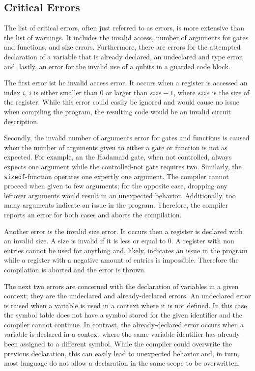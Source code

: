 \subsection{Critical Errors}
The list of critical errors, often just referred to as errors, is more extensive than the list of warnings. It includes the invalid access, number of arguments for gates and functions, and size errors. Furthermore, there are errors for the attempted declaration of a variable that is already declared, an undeclared and type error, and, lastly, an error for the invalid use of a qubits in a guarded code block.

The first error ist he invalid access error. It occurs when a register is accessed an index $i$, \ie $i$ is either smaller than $0$ or larger than $size - 1$, where $size$ is the size of the register. While this error could easily be ignored and would cause no issue when compiling the program, the resulting code would be an invalid circuit description. 

Secondly, the invalid number of arguments error for gates and functions is caused when the number of arguments given to either a gate or function is not as expected. For example, an the Hadamard gate, when not controlled, always expects one argument while the controlled-not gate requires two. Similarly, the \texttt{sizeof}-function operates one expertly one argument. The compiler cannot proceed when given to few arguments; for the opposite case, dropping any leftover arguments would result in an unexpected behavior. Additionally, too many arguments indicate an issue in the program. Therefore, the compiler reports an error for both cases and aborts the compilation.

Another error is the invalid size error. It occurs then a register is declared with an invalid size. A size is invalid if it is less or equal to $0$. A register with non entries cannot be used for anything and, likely, indicates an issue in the program while a register with a negative amount of entries is impossible. Therefore the compilation is aborted and the error is thrown.

The next two errors are concerned with the declaration of variables in a given context; they are the undeclared and already-declared errors. An undeclared error is raised when a variable is used in a context where it is not defined. In this case, the symbol table does not have a symbol stored for the given identifier and the compiler cannot continue. In contrast, the already-declared error occurs when a variable is declared in a context where the same variable identifier has already been assigned to a different symbol. While the compiler could overwrite the previous declaration, this can easily lead to unexpected behavior and, in turn, most language do not allow a declaration in the same scope to be overwritten. 


